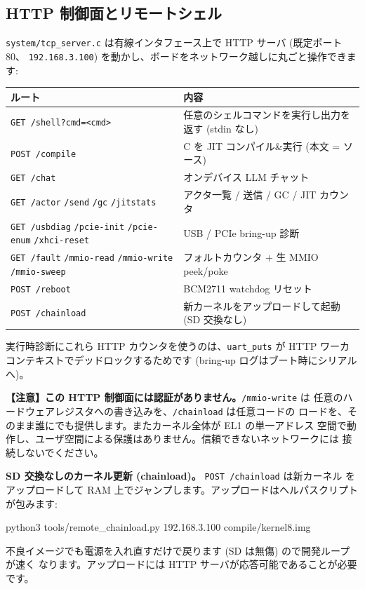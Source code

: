 \documentclass[a4paper,11pt]{ltjsarticle}
\begin{document}
\subsection{HTTP 制御面とリモートシェル}\label{sec:httpshell}
\verb|system/tcp_server.c| は有線インタフェース上で HTTP サーバ (既定ポート 80、
\verb|192.168.3.100|) を動かし、ボードをネットワーク越しに丸ごと操作できます:
\begin{center}\footnotesize
\begin{tabular}{@{}l p{8.0cm}@{}}
\toprule \textbf{ルート} & \textbf{内容}\\ \midrule
\verb|GET /shell?cmd=<cmd>| & 任意のシェルコマンドを実行し出力を返す (stdin なし)\\
\verb|POST /compile| & C を JIT コンパイル\&実行 (本文 = ソース)\\
\verb|GET /chat| & オンデバイス LLM チャット\\
\verb|GET /actor| \verb|/send| \verb|/gc| \verb|/jitstats| & アクタ一覧 / 送信 / GC / JIT カウンタ\\
\verb|GET /usbdiag| \verb|/pcie-init| \verb|/pcie-enum| \verb|/xhci-reset| & USB / PCIe bring-up 診断\\
\verb|GET /fault| \verb|/mmio-read| \verb|/mmio-write| \verb|/mmio-sweep| & フォルトカウンタ + 生 MMIO peek/poke\\
\verb|POST /reboot| & BCM2711 watchdog リセット\\
\verb|POST /chainload| & 新カーネルをアップロードして起動 (SD 交換なし)\\
\bottomrule
\end{tabular}
\end{center}
実行時診断にこれら HTTP カウンタを使うのは、\verb|uart_puts| が HTTP ワーカ
コンテキストでデッドロックするためです (bring-up ログはブート時にシリアルへ)。

\textbf{【注意】この HTTP 制御面には認証がありません。}\verb|/mmio-write| は
任意のハードウェアレジスタへの書き込みを、\verb|/chainload| は任意コードの
ロードを、そのまま誰にでも提供します。またカーネル全体が EL1 の単一アドレス
空間で動作し、ユーザ空間による保護はありません。信頼できないネットワークには
接続しないでください。

\textbf{SD 交換なしのカーネル更新 (chainload)。} \verb|POST /chainload| は新カーネル
をアップロードして RAM 上でジャンプします。アップロードはヘルパスクリプトが包みます:
\begin{code}
python3 tools/remote_chainload.py 192.168.3.100 compile/kernel8.img
\end{code}
不良イメージでも電源を入れ直すだけで戻ります (SD は無傷) ので開発ループが速く
なります。アップロードには HTTP サーバが応答可能であることが必要です。
\end{document}
